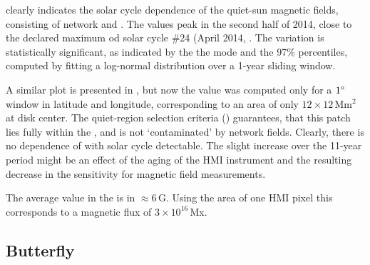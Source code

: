\documentclass{aa}
\begin{document}
 clearly indicates the solar cycle dependence of the quiet-sun magnetic fields, consisting of network and \IN{}. The \brms{} values peak in the second half of 2014, close to the declared maximum od solar cycle \#24 (April 2014, . The variation is statistically significant, as indicated by the the mode and the 97\% percentiles, computed by fitting a log-normal distribution over a 1-year sliding window.

A similar plot is presented in , but now the \brms{} value was computed only for a $1\degree$ window in latitude and longitude, corresponding to an area of only $12\times 12$\,Mm$^2$ at disk center. The quiet-region selection criteria () guarantees, that this patch lies fully within the \IN{}, and is not `contaminated' by network fields. Clearly, there is no dependence of \brms{} with solar cycle detectable. The slight increase over the 11-year period might be an effect of the aging of the HMI instrument and the resulting decrease in the sensitivity for magnetic field measurements.

The average \brms{} value in the \IN{} is in $\approx6$\,G. Using the area of one HMI pixel this corresponds to a magnetic flux of $3\times 10^16$\,Mx. 





\subsection{Butterfly}
\end{document}
